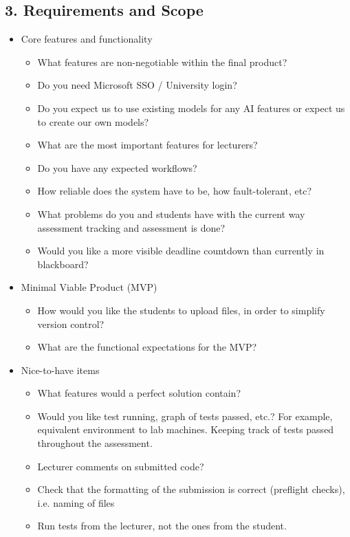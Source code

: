 \documentclass[11pt,a4paper]{article}
\begin{document}
\subsection*{3. Requirements and Scope \hfill}
\begin{itemize}[leftmargin=*]
    \item Core features and functionality
    \begin{itemize}
        \item What features are non-negotiable within the final product?
        \item Do you need Microsoft SSO / University login?
        \item Do you expect us to use existing models for any AI features or expect us to create our own models?
        \item What are the most important features for lecturers?
        \item Do you have any expected workflows?
        \item How reliable does the system have to be, how fault-tolerant, etc?
        \item What problems do you and students have with the current way assessment tracking and assessment is done?    
        \item Would you like a more visible deadline countdown than currently in blackboard?      
    \end{itemize}
    \item Minimal Viable Product (MVP)
    \begin{itemize}
        \item How would you like the students to upload files, in order to simplify version control?
        \item What are the functional expectations for the MVP?
    \end{itemize}
    \item Nice-to-have items
    \begin{itemize}
        \item What features would a perfect solution contain?
        \item Would you like test running, graph of tests passed, etc.? For example, equivalent environment to lab machines. Keeping track of tests passed throughout the assessment.
        \item Lecturer comments on submitted code?
        \item Check that the formatting of the submission is correct (preflight checks), i.e. naming of files
        \item Run tests from the lecturer, not the ones from the student.

\end{itemize}
\end{itemize}
\end{document}
